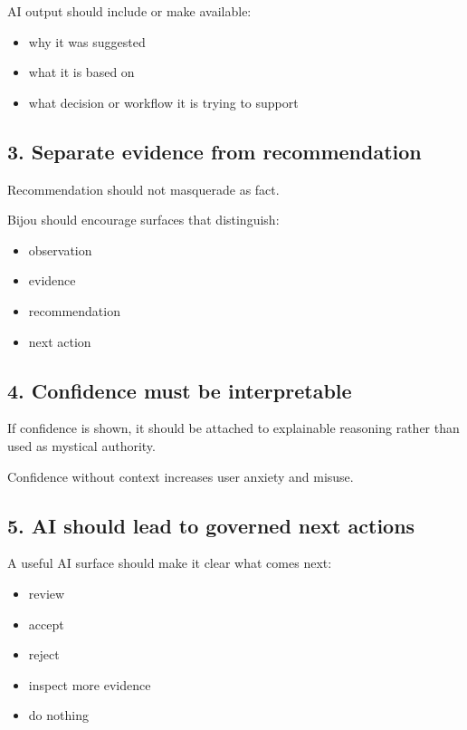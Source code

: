 AI output should include or make available:

\begin{itemize}
\tightlist
\item
  why it was suggested
\item
  what it is based on
\item
  what decision or workflow it is trying to support
\end{itemize}

\subsection{3. Separate evidence from recommendation}\label{record-033-separate-evidence-from-recommendation}

Recommendation should not masquerade as fact.

Bijou should encourage surfaces that distinguish:

\begin{itemize}
\tightlist
\item
  observation
\item
  evidence
\item
  recommendation
\item
  next action
\end{itemize}

\subsection{4. Confidence must be interpretable}\label{record-033-confidence-must-be-interpretable}

If confidence is shown, it should be attached to explainable reasoning rather than used as mystical authority.

Confidence without context increases user anxiety and misuse.

\subsection{5. AI should lead to governed next actions}\label{record-033-ai-should-lead-to-governed-next-actions}

A useful AI surface should make it clear what comes next:

\begin{itemize}
\tightlist
\item
  review
\item
  accept
\item
  reject
\item
  inspect more evidence
\item
  do nothing
\end{itemize}

